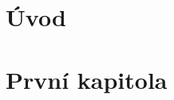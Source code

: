 \documentclass[oneside]{book}
\begin{document}
\frontmatter
{}
\chapter{Úvod}
\mainmatter
\chapter{První kapitola}
\lipsum[1-3]
\end{document}
